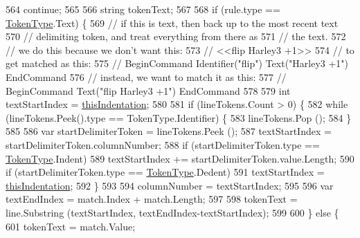 \begin{DoxyCode}
564                         \textcolor{keywordflow}{continue};
565 
566                     \textcolor{keywordtype}{string} tokenText;
567 
568                     \textcolor{keywordflow}{if} (rule.type == \hyperlink{a00053_a301aa7c866593a5b625a8fc158bbeace}{TokenType}.Text) \{
569                         \textcolor{comment}{// if this is text, then back up to the most recent text}
570                         \textcolor{comment}{// delimiting token, and treat everything from there as}
571                         \textcolor{comment}{// the text.}
572                         \textcolor{comment}{// we do this because we don't want this:}
573                         \textcolor{comment}{//    <<flip Harley3 +1>>}
574                         \textcolor{comment}{// to get matched as this:}
575                         \textcolor{comment}{//    BeginCommand Identifier("flip") Text("Harley3 +1") EndCommand}
576                         \textcolor{comment}{// instead, we want to match it as this:}
577                         \textcolor{comment}{//    BeginCommand Text("flip Harley3 +1") EndCommand}
578 
579                         \textcolor{keywordtype}{int} textStartIndex = \hyperlink{a00351_a0e59365a4aa5811f6495b92a51e23573}{thisIndentation};
580 
581                         \textcolor{keywordflow}{if} (lineTokens.Count > 0) \{
582                             \textcolor{keywordflow}{while} (lineTokens.Peek().type == TokenType.Identifier) \{
583                                 lineTokens.Pop ();
584                             \}
585 
586                             var startDelimiterToken = lineTokens.Peek ();
587                             textStartIndex = startDelimiterToken.columnNumber;
588                             \textcolor{keywordflow}{if} (startDelimiterToken.type == \hyperlink{a00053_a301aa7c866593a5b625a8fc158bbeace}{TokenType}.Indent)
589                                 textStartIndex += startDelimiterToken.value.Length;
590                             \textcolor{keywordflow}{if} (startDelimiterToken.type == \hyperlink{a00053_a301aa7c866593a5b625a8fc158bbeace}{TokenType}.Dedent)
591                                 textStartIndex = \hyperlink{a00351_a0e59365a4aa5811f6495b92a51e23573}{thisIndentation};
592                         \}
593 
594                         columnNumber = textStartIndex;
595 
596                         var textEndIndex = match.Index + match.Length;
597 
598                         tokenText = line.Substring (textStartIndex, textEndIndex-textStartIndex);
599 
600                     \} \textcolor{keywordflow}{else} \{
601                         tokenText = match.Value;

\end{DoxyCode}
